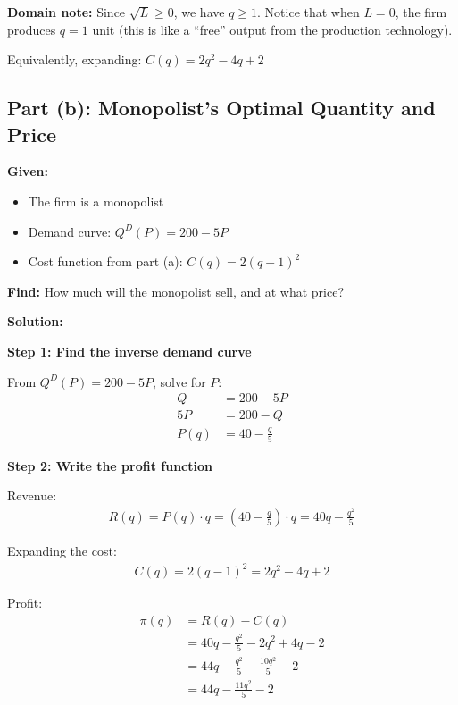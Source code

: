\documentclass[11pt]{article}
\begin{document}
\textbf{Domain note:} Since $\sqrt{L} \geq 0$, we have $q \geq 1$. Notice that when $L = 0$, the firm produces $q = 1$ unit (this is like a ``free'' output from the production technology).

\vspace{0.3cm}


\vspace{0.2cm}

Equivalently, expanding: $C(q) = 2q^2 - 4q + 2$

\newpage

\subsection*{Part (b): Monopolist's Optimal Quantity and Price}

\textbf{Given:}
\begin{itemize}
    \item The firm is a monopolist
    \item Demand curve: $Q^D(P) = 200 - 5P$
    \item Cost function from part (a): $C(q) = 2(q-1)^2$
\end{itemize}

\textbf{Find:} How much will the monopolist sell, and at what price?

\vspace{0.3cm}

\textbf{Solution:}

\textbf{Step 1: Find the inverse demand curve}

From $Q^D(P) = 200 - 5P$, solve for $P$:
\begin{align*}
    Q &= 200 - 5P \\
    5P &= 200 - Q \\
    P(q) &= 40 - \frac{q}{5}
\end{align*}

\textbf{Step 2: Write the profit function}

Revenue:
\begin{align*}
    R(q) = P(q) \cdot q = \left(40 - \frac{q}{5}\right) \cdot q = 40q - \frac{q^2}{5}
\end{align*}

Expanding the cost:
\begin{align*}
    C(q) = 2(q - 1)^2 = 2q^2 - 4q + 2
\end{align*}

Profit:
\begin{align*}
    \pi(q) &= R(q) - C(q) \\
    &= 40q - \frac{q^2}{5} - 2q^2 + 4q - 2 \\
    &= 44q - \frac{q^2}{5} - \frac{10q^2}{5} - 2 \\
    &= 44q - \frac{11q^2}{5} - 2
\end{align*}
\end{document}
